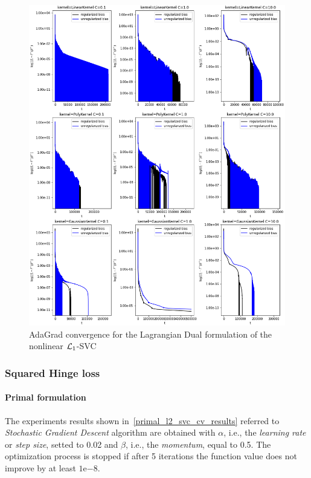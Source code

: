 \begin{figure}[H]
	\centering
	\includegraphics[scale=0.55]{img/lagrangian_dual_l1_svc_loss_history}
	\caption{AdaGrad convergence for the Lagrangian Dual formulation of the nonlinear $\protect \mathcal{L}_1$-SVC}
	\label{fig:lagrangian_dual_l1_svc_loss_history}
\end{figure}

\pagebreak

\subsubsection{Squared Hinge loss}

\paragraph{Primal formulation}

The experiments results shown in~\ref{primal_l2_svc_cv_results} referred to \emph{Stochastic Gradient Descent} algorithm are obtained with $\alpha$, i.e., the \emph{learning rate} or \emph{step size}, setted to 0.02 and $\beta$, i.e., the \emph{momentum}, equal to 0.5. The optimization process is stopped if after 5 iterations the function value does not improve by at least $1\mathrm{e}{-8}$.

